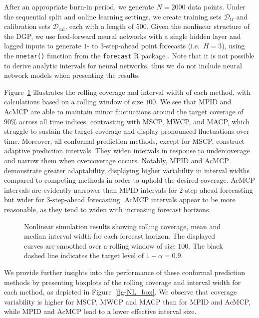 \documentclass[
  11pt,
  12pt]{article}
\theoremstyle{plain}
\theoremstyle{remark}
\begin{document}
After an appropriate burn-in period, we generate \(N=2000\) data points.
Under the sequential split and online learning settings, we create
training sets \(\mathcal{D}_{\text{tr}}\) and calibration sets
\(\mathcal{D}_{\text{cal}}\), each with a length of \(500\). Given the
nonlinear structure of the DGP, we use feed-forward neural networks with
a single hidden layer and lagged inputs to generate \(1\)- to
\(3\)-step-ahead point forecasts (i.e.~\(H=3\)), using the
\texttt{nnetar()} function from the \texttt{forecast} R package
\citep{hyndman2024}. Note that it is not possible to derive analytic
intervals for neural networks, thus we do not include neural network
models when presenting the results.

Figure~\ref{fig-NL_cov} illustrates the rolling coverage and interval
width of each method, with calculations based on a rolling window of
size \(100\). We see that MPID and AcMCP are able to maintain minor
fluctuations around the target coverage of \(90\%\) across all time
indices, contrasting with MSCP, MWCP, and MACP, which struggle to
sustain the target coverage and display pronounced fluctuations over
time. Moreover, all conformal prediction methods, except for MSCP,
construct adaptive prediction intervals. They widen intervals in
response to undercoverage and narrow them when overcoverage occurs.
Notably, MPID and AcMCP demonstrate greater adaptability, displaying
higher variability in interval widths compared to competing methods in
order to uphold the desired coverage. AcMCP intervals are evidently
narrower than MPID intervals for \(2\)-step-ahead forecasting but wider
for \(3\)-step-ahead forecasting. AcMCP intervals appear to be more
reasonable, as they tend to widen with increasing forecast horizons.

\begin{figure}


\caption{\label{fig-NL_cov}Nonlinear simulation results showing rolling
coverage, mean and median interval width for each forecast horizon. The
displayed curves are smoothed over a rolling window of size \(100\). The
black dashed line indicates the target level of \(1-\alpha=0.9\).}

\end{figure}%

We provide further insights into the performance of these conformal
prediction methods by presenting boxplots of the rolling coverage and
interval width for each method, as depicted in Figure~\ref{fig-NL_box}.
We observe that coverage variability is higher for MSCP, MWCP and MACP
than for MPID and AcMCP, while MPID and AcMCP lead to a lower effective
interval size.
\end{document}
